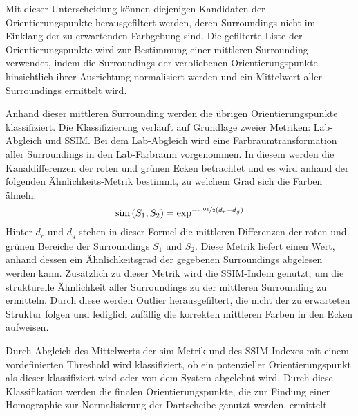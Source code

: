 Mit dieser Unterscheidung können diejenigen Kandidaten der Orientierungspunkte herausgefiltert werden, deren Surroundings nicht im Einklang der zu erwartenden Farbgebung sind. Die gefilterte Liste der Orientierungspunkte wird zur Bestimmung einer mittleren Surrounding verwendet, indem die Surroundings der verbliebenen Orientierungspunkte hinsichtlich ihrer Ausrichtung normalisiert werden und ein Mittelwert aller Surroundings ermittelt wird.

Anhand dieser mittleren Surrounding werden die übrigen Orientierungspunkte klassifiziert. Die Klassifizierung verläuft auf Grundlage zweier Metriken: Lab-Abgleich und SSIM. Bei dem Lab-Abgleich wird eine Farbraumtransformation aller Surroundings in den Lab-Farbraum vorgenommen. In diesem werden die Kanaldifferenzen der roten und grünen Ecken betrachtet und es wird anhand der folgenden Ähnlichkeits-Metrik bestimmt, zu welchem Grad sich die Farben ähneln:
\[\text{sim}\left(S_1, S_2\right) = \exp^{-\nicefrac{0.01}{2}(d_r + d_g)}\]
Hinter $d_r$ und $d_g$ stehen in dieser Formel die mittleren Differenzen der roten und grünen Bereiche der Surroundings $S_1$ und $S_2$. Diese Metrik liefert einen Wert, anhand dessen ein Ähnlichkeitsgrad der gegebenen Surroundings abgelesen werden kann. Zusätzlich zu dieser Metrik wird die SSIM-Indem genutzt, um die strukturelle Ähnlichkeit aller Surroundings zu der mittleren Surrounding zu ermitteln. Durch diese werden Outlier herausgefiltert, die nicht der zu erwarteten Struktur folgen und lediglich zufällig die korrekten mittleren Farben in den Ecken aufweisen.

Durch Abgleich des Mittelwerts der $\text{sim}$-Metrik und des SSIM-Indexes mit einem vordefinierten Threshold wird klassifiziert, ob ein potenzieller Orientierungspunkt als dieser klassifiziert wird oder von dem System abgelehnt wird. Durch diese Klassifikation werden die finalen Orientierungspunkte, die zur Findung einer Homographie zur Normalisierung der Dartscheibe genutzt werden, ermittelt.
